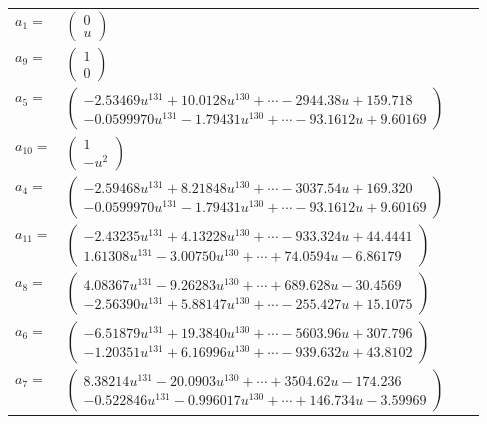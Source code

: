 \documentclass[1p]{elsarticle_modified}
\theoremstyle{definition}
\begin{document}
\begin{tabular}{m{7pt} m{180pt} m{7pt} m{180pt} }
\flushright $a_{1}=$&$\begin{pmatrix}0\\u\end{pmatrix}$ \\
\flushright $a_{9}=$&$\begin{pmatrix}1\\0\end{pmatrix}$ \\
\flushright $a_{5}=$&$\begin{pmatrix}-2.53469 u^{131}+10.0128 u^{130}+\cdots-2944.38 u+159.718\\-0.0599970 u^{131}-1.79431 u^{130}+\cdots-93.1612 u+9.60169\end{pmatrix}$ \\
\flushright $a_{10}=$&$\begin{pmatrix}1\\- u^2\end{pmatrix}$ \\
\flushright $a_{4}=$&$\begin{pmatrix}-2.59468 u^{131}+8.21848 u^{130}+\cdots-3037.54 u+169.320\\-0.0599970 u^{131}-1.79431 u^{130}+\cdots-93.1612 u+9.60169\end{pmatrix}$ \\
\flushright $a_{11}=$&$\begin{pmatrix}-2.43235 u^{131}+4.13228 u^{130}+\cdots-933.324 u+44.4441\\1.61308 u^{131}-3.00750 u^{130}+\cdots+74.0594 u-6.86179\end{pmatrix}$ \\
\flushright $a_{8}=$&$\begin{pmatrix}4.08367 u^{131}-9.26283 u^{130}+\cdots+689.628 u-30.4569\\-2.56390 u^{131}+5.88147 u^{130}+\cdots-255.427 u+15.1075\end{pmatrix}$ \\
\flushright $a_{6}=$&$\begin{pmatrix}-6.51879 u^{131}+19.3840 u^{130}+\cdots-5603.96 u+307.796\\-1.20351 u^{131}+6.16996 u^{130}+\cdots-939.632 u+43.8102\end{pmatrix}$ \\
\flushright $a_{7}=$&$\begin{pmatrix}8.38214 u^{131}-20.0903 u^{130}+\cdots+3504.62 u-174.236\\-0.522846 u^{131}-0.996017 u^{130}+\cdots+146.734 u-3.59969\end{pmatrix}$ \\

\end{tabular}
\end{document}
